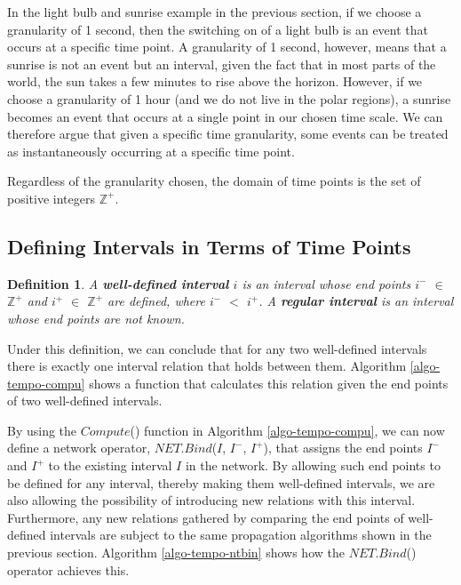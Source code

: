 \documentclass[11pt]{report}
\newtheorem{vdefinition}{Definition}[chapter]
\begin{document}
        In the light bulb and sunrise example in the previous section, if we
        choose a granularity of 1 second, then the switching on of a light bulb is an
        event that occurs at a specific time point. A granularity of 1 second,
        however, means that a sunrise is not an event but an interval, given the fact
        that in most parts of the world, the sun takes a few minutes to rise above the
        horizon. However, if we choose a granularity of 1 hour (and we do not
        live in the polar regions), a sunrise becomes an event that occurs at a single
        point in our chosen time scale. We can therefore argue that given a specific
        time granularity, some events can be treated as instantaneously occurring at a
        specific time point.

        Regardless of the granularity chosen, the domain of time points is the set of
        positive integers ${\mathbb Z}^{+}$.

      \subsection{Defining Intervals in Terms of Time Points}
        \label{subs-tempo-inttp}

        \begin{vdefinition}
          \label{defn-tempo-intvl}
          A {\bf well-defined interval} $i$ is an interval whose end points
          $i^{-}$ $\in$ ${\mathbb Z}^{+}$ and $i^{+}$ $\in$ ${\mathbb Z}^{+}$
          are defined, where $i^{-}$ $<$ $i^{+}$. A {\bf regular interval} is
          an interval whose end points are not known.
        \end{vdefinition}

        Under this definition, we can conclude that for any two well-defined
        intervals there is exactly one interval relation that holds between
        them. Algorithm \ref{algo-tempo-compu} shows a function that calculates
        this relation given the end points of two well-defined intervals.

        By using the $Compute$() function in Algorithm \ref{algo-tempo-compu},
        we can now define a network operator, $NET.Bind$($I$, $I^-$, $I^+$),
        that assigns the end points $I^-$ and $I^+$ to the existing interval
        $I$ in the network. By allowing such end points to be defined for any
        interval, thereby making them well-defined intervals, we are also
        allowing the possibility of introducing new relations with this
        interval. Furthermore, any new relations gathered by comparing the end
        points of well-defined intervals are subject to the same propagation
        algorithms shown in the previous section. Algorithm
        \ref{algo-tempo-ntbin} shows how the $NET.Bind$() operator achieves
        this.
\end{document}
